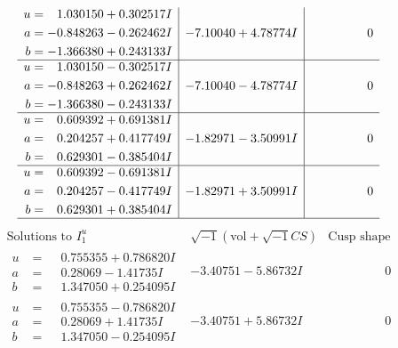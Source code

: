 \documentclass[1p]{elsarticle_modified}
\theoremstyle{definition}
\newcommand{\I}{\sqrt{-1}}
\begin{document}
$$\begin{array}{c|c|c}
\begin{aligned}
u &= \phantom{-}1.030150 + 0.302517 I \\
a &= -0.848263 - 0.262462 I \\
b &= -1.366380 + 0.243133 I\end{aligned}
 & -7.10040 + 4.78774 I & \phantom{-0.000000 } 0 \\ \hline\begin{aligned}
u &= \phantom{-}1.030150 - 0.302517 I \\
a &= -0.848263 + 0.262462 I \\
b &= -1.366380 - 0.243133 I\end{aligned}
 & -7.10040 - 4.78774 I & \phantom{-0.000000 } 0 \\ \hline\begin{aligned}
u &= \phantom{-}0.609392 + 0.691381 I \\
a &= \phantom{-}0.204257 + 0.417749 I \\
b &= \phantom{-}0.629301 - 0.385404 I\end{aligned}
 & -1.82971 - 3.50991 I & \phantom{-0.000000 } 0 \\ \hline\begin{aligned}
u &= \phantom{-}0.609392 - 0.691381 I \\
a &= \phantom{-}0.204257 - 0.417749 I \\
b &= \phantom{-}0.629301 + 0.385404 I\end{aligned}
 & -1.82971 + 3.50991 I & \phantom{-0.000000 } 0\\
 \hline 
 \end{array}$$\newpage$$\begin{array}{c|c|c}  
\text{Solutions to }I^u_{1}& \I (\text{vol} + \sqrt{-1}CS) & \text{Cusp shape}\\
 \hline 
\begin{aligned}
u &= \phantom{-}0.755355 + 0.786820 I \\
a &= \phantom{-}0.28069 - 1.41735 I \\
b &= \phantom{-}1.347050 + 0.254095 I\end{aligned}
 & -3.40751 - 5.86732 I & \phantom{-0.000000 } 0 \\ \hline\begin{aligned}
u &= \phantom{-}0.755355 - 0.786820 I \\
a &= \phantom{-}0.28069 + 1.41735 I \\
b &= \phantom{-}1.347050 - 0.254095 I\end{aligned}
 & -3.40751 + 5.86732 I & \phantom{-0.000000 } 0 \\ \hline\begin{aligned}

\end{aligned}
\end{array}$$
\end{document}

